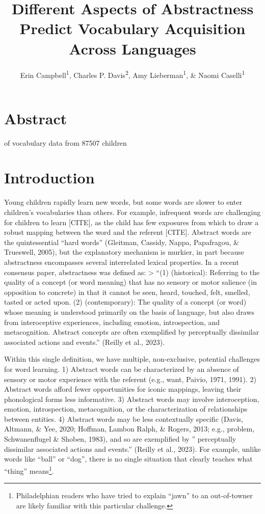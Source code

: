 \documentclass[
  man,floatsintext]{apa6}
\title{Different Aspects of Abstractness Predict Vocabulary Acquisition Across Languages}
\author{Erin Campbell\textsuperscript{1}, Charles P. Davis\textsuperscript{2}, Amy Lieberman\textsuperscript{1}, \& Naomi Caselli\textsuperscript{1}}
\date{}
\affiliation{\vspace{0.5cm}\textsuperscript{2} Department of Psychology \& Neuroscience, Duke University, Durham, NC\\\textsuperscript{1} Wheelock College of Education \& Human Development, Boston University, Boston, MA}
\begin{document}
\maketitle

\section{Abstract}\label{abstract}

of vocabulary data from 87507 children

\section{Introduction}\label{introduction}

Young children rapidly learn new words, but some words are slower to enter children's vocabularies than others. For example, infrequent words are challenging for children to learn {[}CITE{]}, as the child has few exposures from which to draw a robust mapping between the word and the referent {[}CITE{]}. Abstract words are the quintessential ``hard words'' (Gleitman, Cassidy, Nappa, Papafragou, \& Trueswell, 2005), but the explanatory mechanism is murkier, in part because abstractness encompasses several interrelated lexical properties. In a recent consensus paper, abstractness was defined as:
\textgreater{} ``(1) (historical): Referring to the quality of a concept (or word meaning) that has no sensory or motor salience (in opposition to concrete) in that it cannot be seen, heard, touched, felt, smelled, tasted or acted upon. (2) (contemporary): The quality of a concept (or word) whose meaning is understood primarily on the basis of language, but also draws from interoceptive experiences, including emotion, introspection, and metacognition. Abstract concepts are often exemplified by perceptually dissimilar associated actions and events.'' (Reilly et al., 2023).

Within this single definition, we have multiple, non-exclusive, potential challenges for word learning.
1) Abstract words can be characterized by an absence of sensory or motor experience with the referent (e.g., want, Paivio, 1971, 1991).
2) Abstract words afford fewer opportunities for iconic mappings, leaving their phonological forms less informative.
3) Abstract words may involve interoception, emotion, introspection, metacognition, or the characterization of relationships between entities.
4) Abstract words may be less contextually specific (Davis, Altmann, \& Yee, 2020; Hoffman, Lambon Ralph, \& Rogers, 2013; e.g., problem, Schwanenflugel \& Shoben, 1983), and so are exemplified by '' perceptually dissimilar associated actions and events.'' (Reilly et al., 2023). For example, unlike words like ``ball'' or ``dog'', there is no single situation that clearly teaches what ``thing'' means\footnote{Philadelphian readers who have tried to explain ``jawn'' to an out-of-towner are likely familiar with this particular challenge.}.
\end{document}
